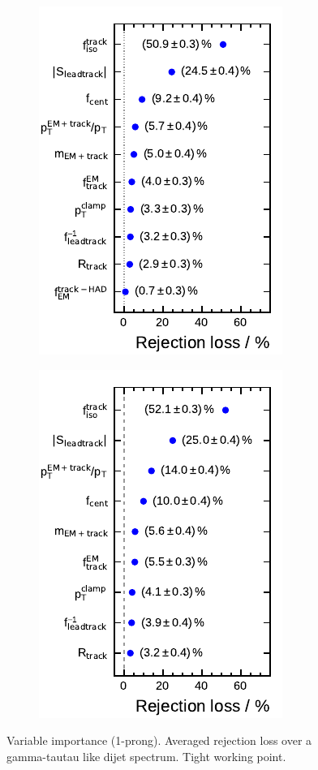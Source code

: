 \begin{figure}[ht]
  \begin{subfigure}[t]{0.33\textwidth}
    \centering
    \includegraphics{./figures/bdt_perf/var_importance/1p_iter1.pdf}
  \end{subfigure}
  \begin{subfigure}[t]{0.33\textwidth}
    \centering
    \includegraphics{./figures/bdt_perf/var_importance/1p_iter2.pdf}
  \end{subfigure}
  \caption{Variable importance (1-prong). Averaged rejection loss over a
    gamma-tautau like dijet spectrum. Tight working point.}
  \label{fig:variable_importance_1p_app}
\end{figure}


